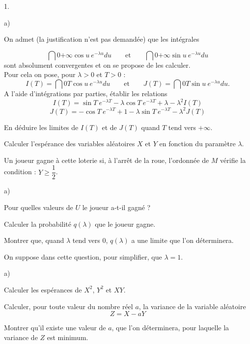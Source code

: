 \documentclass[11pt]{article}%
\begin{document}
\begin{noliste}{1.}
 \setlength{\itemsep}{4mm}
\item 

\begin{noliste}{a)}
 \setlength{\itemsep}{2mm}
\item On admet (la justification n'est pas demandée) que les intégrales

\[
\dint{0}{+ \infty }\cos {u}\ e^{-\lambda u}du\qquad \text{et}\qquad
\dint{0}{+ \infty }\sin {u}\ e^{-\lambda u}du
\]
sont absolument convergentes et on se propose de les calculer. \\
Pour cela on pose, pour $\lambda >0$ et $T>0$ : 
\[
I(T) = \dint{0}{T}\cos {u}\ e^{-\lambda u}du\qquad \text{et}\qquad
J(T) = \dint{0}{T}\sin {u}\ e^{-\lambda u}du.
\]
A l'aide d'intégrations par parties, établir les relations 
\[
I(T) = \sin {T}\ e^{-\lambda T}-\lambda \cos {T}\ e^{-\lambda T} +
\lambda
-\lambda ^{2}I(T)
\]
\[
J(T) = -\cos {T}\ e^{-\lambda T} + 1-\lambda \sin {T}\ e^{-\lambda
T}-\lambda
^{2}J(T)
\]

\item En déduire les limites de $I(T)$ et de $J(T)$ quand $T$ tend vers
$ + \infty $.

\item Calculer l'espérance des variables aléatoires $X$ et $Y$ en
fonction
du paramètre $\lambda $.
\end{noliste}

\item Un joueur gagne à cette loterie si, à l'arrêt de la roue,
l'ordonnée
de $M$ vérifie la condition : $Y\geq \dfrac{1}{2}$.

\begin{noliste}{a)}
 \setlength{\itemsep}{2mm}
\item Pour quelles valeurs de $U$ le joueur a-t-il gagné ?

\item Calculer la probabilité $q(\lambda )$ que le joueur gagne.

\item Montrer que, quand $\lambda $ tend vers 0, $q(\lambda )$ a une
limite
que l'on déterminera.
\end{noliste}

\item On suppose dans cette question, pour simplifier, que $\lambda =
1$.

\begin{noliste}{a)}
 \setlength{\itemsep}{2mm}
\item Calculer les espérances de $X^{2}$, $Y^{2}$ et $XY$.

\item Calculer, pour toute valeur du nombre réel $a$, la variance de la
variable aléatoire 
\[
Z = X-aY
\]

\item Montrer qu'il existe une valeur de $a$, que l'on déterminera,
pour
laquelle la variance de $Z$ est minimum.
\end{noliste}
\end{noliste}

\label{fin}
\end{document}
